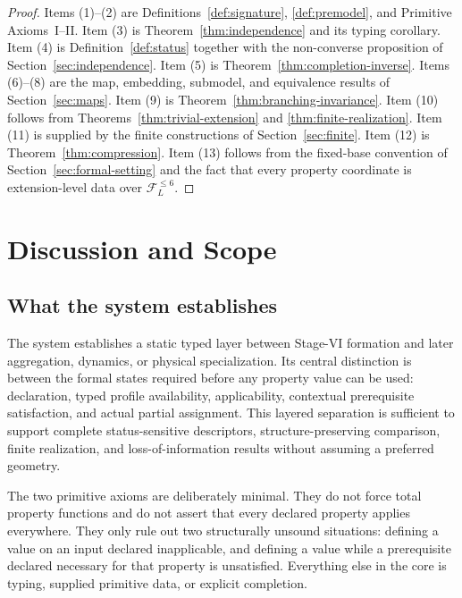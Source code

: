 \documentclass[11pt]{article}
\newcommand{\FVI}{\mathcal F_{L}^{\le 6}}
\theoremstyle{definition}
\theoremstyle{remark}
\begin{document}
\begin{proof}
Items (1)--(2) are Definitions~\ref{def:signature}, \ref{def:premodel}, and Primitive Axioms~I--II.
Item (3) is Theorem~\ref{thm:independence} and its typing corollary.
Item (4) is Definition~\ref{def:status} together with the non-converse proposition of Section~\ref{sec:independence}.
Item (5) is Theorem~\ref{thm:completion-inverse}.
Items (6)--(8) are the map, embedding, submodel, and equivalence results of Section~\ref{sec:maps}.
Item (9) is Theorem~\ref{thm:branching-invariance}.
Item (10) follows from Theorems~\ref{thm:trivial-extension} and \ref{thm:finite-realization}.
Item (11) is supplied by the finite constructions of Section~\ref{sec:finite}.
Item (12) is Theorem~\ref{thm:compression}.
Item (13) follows from the fixed-base convention of Section~\ref{sec:formal-setting} and the fact that every property coordinate is extension-level data over \(\FVI\).
\end{proof}

\section{Discussion and Scope}
\label{sec:discussion}

\subsection{What the system establishes}

The system establishes a static typed layer between Stage-VI formation and later aggregation, dynamics, or physical specialization.
Its central distinction is between the formal states required before any property value can be used: declaration, typed profile availability, applicability, contextual prerequisite satisfaction, and actual partial assignment.
This layered separation is sufficient to support complete status-sensitive descriptors, structure-preserving comparison, finite realization, and loss-of-information results without assuming a preferred geometry.

The two primitive axioms are deliberately minimal.
They do not force total property functions and do not assert that every declared property applies everywhere.
They only rule out two structurally unsound situations: defining a value on an input declared inapplicable, and defining a value while a prerequisite declared necessary for that property is unsatisfied.
Everything else in the core is typing, supplied primitive data, or explicit completion.
\end{document}
